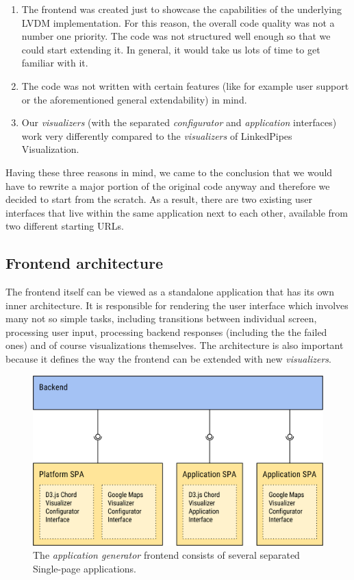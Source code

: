 \begin{enumerate}
\item The frontend was created just to showcase the capabilities of the underlying LVDM implementation. For this reason, the overall code quality was not  a number one priority. The code was not structured well enough so that we could start extending it. In general, it would take us lots of time to get familiar with it. 
\item The code was not written with certain features (like for example user support or the aforementioned general extendability) in mind.
\item Our \emph{visualizers} (with the separated \emph{configurator} and \emph{application} interfaces) work very differently compared to the \emph{visualizers} of LinkedPipes Visualization.

\end{enumerate}
Having these three reasons in mind, we came to the conclusion that we would have to rewrite a major portion of the original code anyway and therefore we decided to start from the scratch. As a result, there are two existing user interfaces that live within the same application next to each other, available from two different starting URLs.

\subsection{Frontend architecture}
\label{sec:system-proposal:architecture-analysis:frontend-architecture}

The frontend itself can be viewed as a standalone application that has its own inner architecture. It is responsible for rendering the user interface which involves many not so simple tasks, including transitions between individual screen, processing user input, processing backend responses (including the the failed ones) and of course visualizations themselves. The architecture is also important because it defines the way the frontend can be extended with new \emph{visualizers}. 
\begin{figure}
	\centering
	\includegraphics[width=140mm]{img/04_frontend_base_structure_spas.png}
	\caption{The \emph{application generator} frontend consists of several separated Single-page applications.} 
	\label{fig:frontend-base-structure-spas}
\end{figure}

